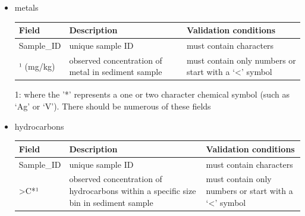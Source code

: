 \documentclass[
  8pt,
  a4paper]{article}
\begin{document}
\begin{itemize}
\item
  metals

  \begin{longtable}[]{@{}
    >{\raggedright\arraybackslash}p{}
    >{\raggedright\arraybackslash}p{}
    >{\raggedright\arraybackslash}p{}@{}}
  \toprule\noalign{}
  \begin{minipage}[b]{\linewidth}\raggedright
  Field
  \end{minipage} & \begin{minipage}[b]{\linewidth}\raggedright
  Description
  \end{minipage} & \begin{minipage}[b]{\linewidth}\raggedright
  Validation conditions
  \end{minipage} \\
  \midrule\noalign{}
  \endhead
  \bottomrule\noalign{}
  \endlastfoot
  Sample\_ID & unique sample ID & must contain characters \\
  *¹ (mg/kg) & observed concentration of metal in sediment sample & must
  contain only numbers or start with a `\textless{}' symbol \\
  \end{longtable}

  1: where the '*' represents a one or two character chemical symbol
  (such as `Ag' or `V'). There should be numerous of these fields
\item
  hydrocarbons

  \begin{longtable}[]{@{}
    >{\raggedright\arraybackslash}p{}
    >{\raggedright\arraybackslash}p{}
    >{\raggedright\arraybackslash}p{}@{}}
  \toprule\noalign{}
  \begin{minipage}[b]{\linewidth}\raggedright
  Field
  \end{minipage} & \begin{minipage}[b]{\linewidth}\raggedright
  Description
  \end{minipage} & \begin{minipage}[b]{\linewidth}\raggedright
  Validation conditions
  \end{minipage} \\
  \midrule\noalign{}
  \endhead
  \bottomrule\noalign{}
  \endlastfoot
  Sample\_ID & unique sample ID & must contain characters \\
  \textgreater C*¹ & observed concentration of hydrocarbons within a
  specific size bin in sediment sample & must contain only numbers or
  start with a `\textless{}' symbol \\
  \end{longtable}


\end{itemize}
\end{document}
